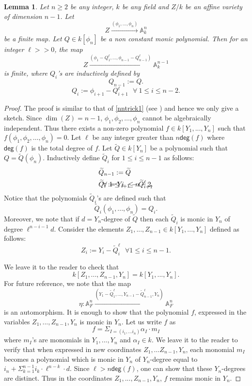 \documentclass[10pt]{amsart}
\theoremstyle{plain}
\newtheorem{lemma}[thm]{Lemma}
\theoremstyle{definition}
\renewcommand{\tilde}{\widetilde}
\newcommand{\A}{{\mathbb A}}
\let\syn\mathsf
\newcommand{\scr}{\scriptscriptstyle}
\newcommand{\dg}{\syn{deg}}
\begin{document}
\begin{lemma}\label{nntrick} Let $n\geq 2$ be any integer, $k$ be any field and 
 $Z/k$ be an affine variety of dimension $n-1$.  Let $$Z\xrightarrow{(\phi_1,...,\phi_n)}\A^{n}_k$$ be a finite map. Let  $Q \in k[\phi_{n}]$ be a non constant monic polynomial. Then for an integer $\ell>>0$, the map 
$$ Z\xrightarrow{(\phi_{\scr 1}-Q^\ell_{\scr 1},\ldots,\phi_{\scr n-1}-{Q^\ell_{\scr n-1}})} \A^{n-1}_k$$ is finite, where $Q_i$'s are inductively defined by 
$$ Q_{n-1}:= Q.$$
$$ Q_{i}:= \phi_{i+1}-Q_{i+1}^\ell \ \ \    \forall \ 1\leq i\leq n-2.$$
\end{lemma}
\begin{proof}The proof is  similar to that of \ref{nntrick1} (see \cite[page 2]{mum}) and hence we only give a sketch. Since $\dim(Z)= n-1$, $\phi_1, \phi_2,\ldots,\phi_n$ cannot be algebraically independent. Thus there exists a non-zero polynomial $f \in k[Y_1,...,Y_n]$  such that $f(\phi_1, \phi_2,\ldots,\phi_n)=0$.
Let $\ell$ be any integer greater than $n\dg(f)$ where $\dg(f)$ is the total degree of $f$. Let $\tilde{Q}\in k[Y_n]$ be a polynomial such that $Q=\tilde{Q}(\phi_n)$. Inductively define $\tilde{Q}_i$ for $1\leq i \leq n-1$ as follows:
\begin{align*}
 & \tilde{Q}_{n-1} : = \tilde{Q}  \\
 & \tilde{Q}_i  := Y_{i+1} - \tilde{Q}_{i+1}^\ell & \hspace{-10cm} \forall \ 1 \leq i \ \leq n-2. 
 \end{align*}
Notice that the polynomials $\tilde{Q}_i$'s are defined such that 
$$ \tilde{Q}_i(\phi_1,...,\phi_n) = Q_i.$$
Moreover, we note that if $d=Y_n$-degree of $\tilde{Q}$ then each $\tilde{Q}_i$ is monic in $Y_n$ of degree ${\ell}^{n-i-1}d$.
Consider the elements $Z_1,...,Z_{n-1}\in k[Y_1,...,Y_n]$ defined  as follows:
$$ Z_i := Y_i - \tilde{Q}_i^\ell \ \ \ \forall 1 \leq i \leq n-1.$$

We leave it to the reader to check that 
$$ k[Z_1,...,Z_{n-1},Y_n] = k[Y_1,...,Y_n].$$ For future reference, we note that the map $$\eta:\A^n_F\xrightarrow {(Y_1-\tilde{Q}_1^\ell,\ldots,Y_{n-1}-\tilde{Q}_{n-1}^\ell,Y_n)}\A^n_F $$ is an automorphism.
It is enough to show that the polynomial $f$, expressed in the variables $Z_1,...,Z_{n-1},Y_n$ is monic in $Y_n$. Let us write $f$ as  $$f=\Sigma_{I=(i_1,\ldots i_n)} \alpha_I \cdot m_{I}$$ where $m_I$'s are monomials in $Y_1,...,Y_n$ and $\alpha_I \in k$. 
  We leave it to the reader to verify that when expressed in new coordinates $Z_1,\ldots Z_{n-1},Y_n$, each monomial $m_I$ becomes a polynomial which is monic in $Y_n$ of $Y_n$-degree equal to $i_n+\Sigma_{k=1}^{n-1} i_k\cdot {\ell}^{n-k}\cdot d$.  Since $\ell > n \dg(f)$, one can show that these $Y_n$-degrees are distinct. Thus in the coordinates $Z_1,...,Z_{n-1},Y_n$, $f$ remains monic in $Y_n$. 
\end{proof}
\end{document}
